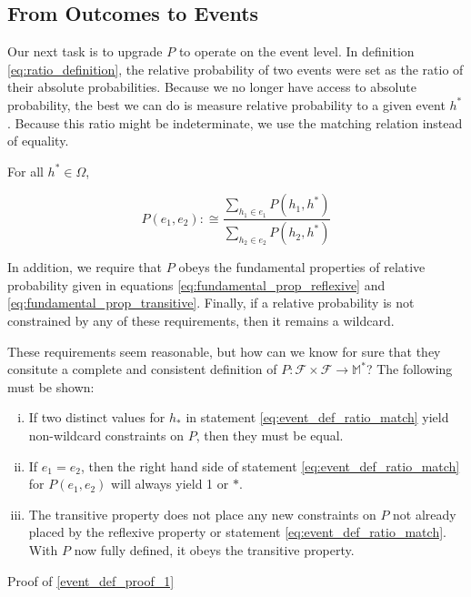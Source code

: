 \documentclass[twoside]{article}
\begin{document}
\subsection{From Outcomes to Events}

Our next task is to upgrade \(P\) to operate on the event level. In definition \ref{eq:ratio_definition}, the relative probability of two events were set as the ratio of their absolute probabilities. Because we no longer have access to absolute probability, the best we can do is measure relative probability to a given event \(h^*\). Because this ratio might be indeterminate, we use the matching relation instead of equality.

For all \(h^* \in \Omega\),

\begin{equation}
\label{eq:event_def_ratio_match}
P(e_1, e_2) :\cong \frac{\sum_{h_1 \in e_1} P(h_1, h^*)}{\sum_{h_2 \in e_2} P(h_2, h^*)}
\end{equation}

In addition, we require that \(P\) obeys the fundamental properties of relative probability given in equations \ref{eq:fundamental_prop_reflexive} and \ref{eq:fundamental_prop_transitive}. Finally, if a relative probability is not constrained by any of these requirements, then it remains a wildcard.

These requirements seem reasonable, but how can we know for sure that they consitute a complete and consistent definition of \(P: \mathcal{F} \times \mathcal{F} \rightarrow \mathbb{M}^*\)? The following must be shown:

\begin{enumerate}[(i)]
  \item \label{event_def_proof_1} If two distinct values for \(h_*\) in statement \ref{eq:event_def_ratio_match} yield non-wildcard constraints on \(P\), then they must be equal.
  \item \label{event_def_proof_2} If \(e_1 = e_2\), then the right hand side of statement \ref{eq:event_def_ratio_match} for \(P(e_1, e_2)\) will always yield 1 or \(\ast\).
  \item \label{event_def_proof_3} The transitive property does not place any new constraints on \(P\) not already placed by the reflexive property or statement \ref{eq:event_def_ratio_match}. With \(P\) now fully defined, it obeys the transitive property.
\end{enumerate}

Proof of \ref{event_def_proof_1}
\end{document}
